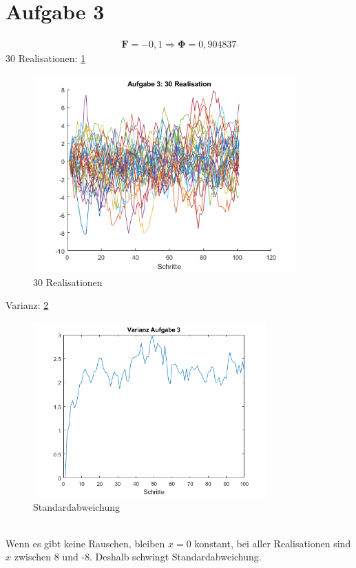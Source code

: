 \section{Aufgabe 3}
\begin{gather}
	\bm{F} = -0,1 \Longrightarrow \bm{\Phi} = 0,904837 
\end{gather}
30 Realisationen: \ref{fig:30real}
\begin{figure}[htbp]
	\centering
	\includegraphics[width=0.9\textwidth]{images/30realisation} 
	\caption{30 Realisationen} 
	\label{fig:30real}
\end{figure}
Varianz: \ref{fig:var3}
\begin{figure}[htbp]
	\centering
	\includegraphics[width=0.8\textwidth]{images/var3} 
	\caption{Standardabweichung} 
	\label{fig:var3}
\end{figure}\\
Wenn es gibt keine Rauschen, bleiben $x = 0$ konstant, bei aller Realisationen sind $x$ zwischen 8 und -8. Deshalb schwingt Standardabweichung.
\clearpage
